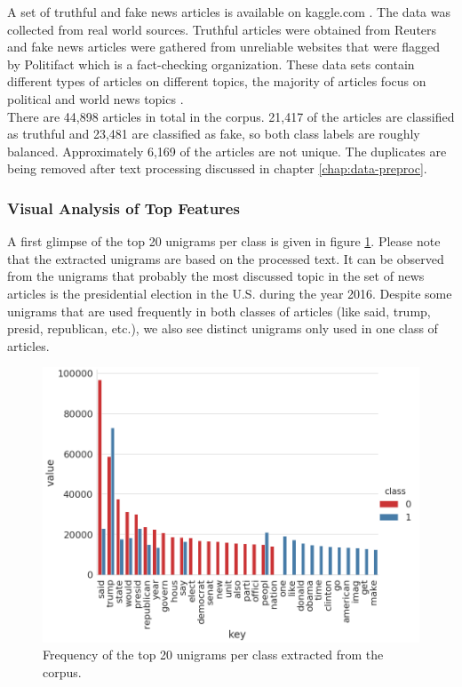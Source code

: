 \documentclass[a4paper,12pt,nottoc]{article}
\begin{document}
A set of truthful and fake news articles is available on kaggle.com \cite{bib:kaggle}. The data was collected from real world sources. Truthful articles were obtained from Reuters and fake news articles were gathered from unreliable websites that were flagged by Politifact which is a fact-checking organization. These data sets contain different types of articles on different topics, the majority of articles focus on political and world news topics \cite{bib:ahmed-2018}.\\

\noindent There are 44,898 articles in total in the corpus. 21,417 of the articles are classified as truthful and 23,481 are classified as fake, so both class labels are roughly balanced. Approximately 6,169 of the articles are not unique. The duplicates are being removed after text processing discussed in chapter \ref{chap:data-preproc}.

\subsubsection{Visual Analysis of Top Features}

A first glimpse of the top 20 unigrams per class is given in figure \ref{fig:top20}. Please note that the extracted unigrams are based on the processed text. It can be observed from the unigrams that probably the most discussed topic in the set of news articles is the presidential election in the U.S. during the year 2016. Despite some unigrams that are used frequently in both classes of articles (like said, trump, presid, republican, etc.), we also see distinct unigrams only used in one class of articles.

\begin{figure}[h]
\includegraphics[width=14cm]{output/word_analysis_1.png}
\centering
\caption{Frequency of the top 20 unigrams per class extracted from the corpus.}\label{fig:top20}
\end{figure}
\end{document}
